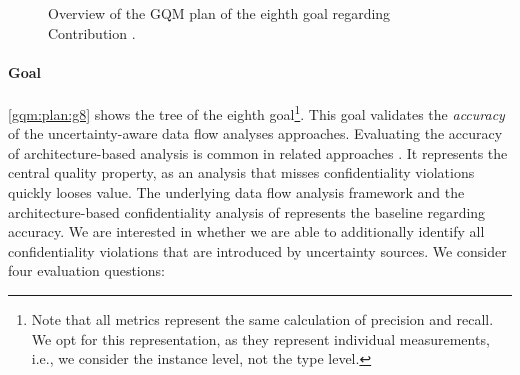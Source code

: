 \newcommand{\textGviii}[0]{Validate the \emph{accuracy} of the identified confidentiality violations of the uncertainty-aware data flow analysis approaches.}
\newcommand{\textGviiiQi}[0]{How \emph{accurate} is the data flow analysis under structural uncertainty?}
\newcommand{\textGviiiQiMi}[0]{$\precisionFormulaFull$}
\newcommand{\textGviiiQiMii}[0]{$\recallFormulaFull$}
\newcommand{\textGviiiQii}[0]{How \emph{accurate} is the data flow analysis under environmental uncertainty?}
\newcommand{\textGviiiQiiMi}[0]{$\precisionFormulaFull$}
\newcommand{\textGviiiQiiMii}[0]{$\recallFormulaFull$}
\newcommand{\textGviiiQiii}[0]{How \emph{accurate} is the tracing of uncertainty in data flow analysis?}
\newcommand{\textGviiiQiiiMi}[0]{$\precisionFormulaFull$}
\newcommand{\textGviiiQiiiMii}[0]{$\recallFormulaFull$}
\newcommand{\textGviiiQiv}[0]{How \emph{accurate} is the impact-aware data flow analysis?}
\newcommand{\textGviiiQivMi}[0]{$\precisionFormulaFull$}
\newcommand{\textGviiiQivMii}[0]{$\recallFormulaFull$}
\begin{figure}
  \centering
  \caption{Overview of the \ac*{GQM} plan of the eighth goal regarding Contribution .}
  \label{gqm:plan:g8}
\end{figure}

\paragraph{Goal }\label{gqm:text:g:8}
\autoref{gqm:plan:g8} shows the tree of the eighth goal\footnote{Note that all metrics represent the same calculation of precision and recall. We opt for this representation, as they represent individual measurements, i.e., we consider the instance level, not the type level.}.
This goal validates the \emph{accuracy} of the uncertainty-aware data flow analyses approaches.
Evaluating the accuracy of architecture-based analysis is common in related approaches \cite{walter_context-based_2023,seifermann_architectural_2022,konersmann_evaluation_2022}.
It represents the central quality property, as an analysis that misses confidentiality violations quickly looses value.
The underlying data flow analysis framework \cite{boltz_extensible_2024} and the architecture-based confidentiality analysis of \textcite{seifermann_architectural_2022} represents the baseline regarding accuracy.
We are interested in whether we are able to additionally identify all confidentiality violations that are introduced by uncertainty sources.
We consider four evaluation questions:

